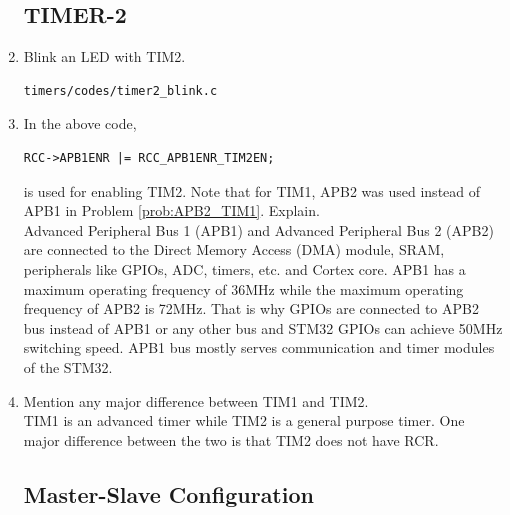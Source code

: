 \begin{enumerate}[label=\arabic*.,ref=\theenumi]
\subsection{TIMER-2}
\item Blink an LED with TIM2.
\\
\solution 
\begin{lstlisting}
timers/codes/timer2_blink.c
\end{lstlisting}
\item In the above code, 
\begin{lstlisting}
RCC->APB1ENR |= RCC_APB1ENR_TIM2EN;
\end{lstlisting}
is used for enabling TIM2. Note that for TIM1, APB2 was used instead of APB1 in Problem \ref{prob:APB2_TIM1}.  Explain.
\\
\solution Advanced Peripheral Bus 1 (APB1) and Advanced Peripheral Bus 2 (APB2) are connected to the Direct Memory Access (DMA) module, SRAM, peripherals like GPIOs, ADC, timers, etc. and Cortex core. APB1 has a maximum operating frequency of 36MHz while the maximum operating frequency of APB2  is 72MHz. That is why GPIOs are connected to APB2 bus instead of APB1 or any other bus and STM32 GPIOs can achieve 50MHz switching speed. APB1 bus mostly serves communication and timer modules of the STM32. 
\item Mention any major difference between TIM1 and TIM2.
\\
\solution TIM1 is an advanced timer while TIM2 is a general purpose timer.  One major difference between the two is that TIM2 does not have RCR.
\subsection{Master-Slave Configuration}

\end{enumerate}
